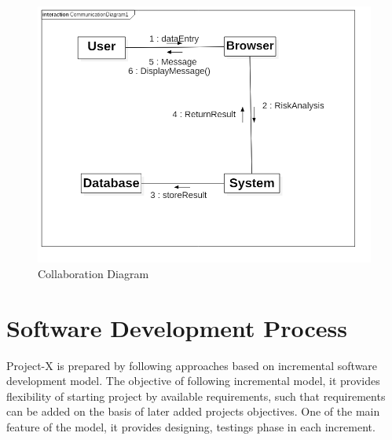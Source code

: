 \begin{figure}[H] %
\begin{center}
	\includegraphics[width = 6in]{images/Collaboration.png}
	\caption{Collaboration Diagram} %
	\label{Collaboration} %
\end{center}
\end{figure}
\newpage
\section{Software Development Process}
Project-X is prepared by following approaches based on incremental software development model.  The objective of following incremental model, it provides flexibility of starting project by available requirements, such that requirements can be added on the basis of later added projects objectives.  One of the main feature of the model, it
provides designing, testings phase in each increment.

